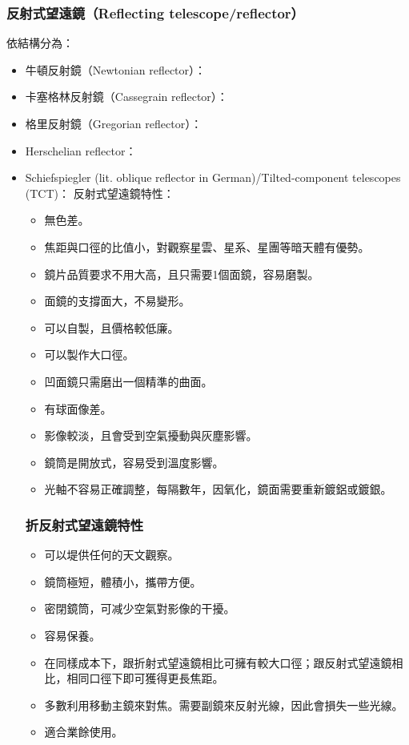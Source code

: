 \documentclass[a4paper,12pt]{report}
\begin{document}
\subsubsection{反射式望遠鏡（Reflecting telescope/reflector）}
依結構分為：
\begin{itemize}
\item 牛頓反射鏡（Newtonian reflector）：
\bctf{}\efct
\item 卡塞格林反射鏡（Cassegrain reflector）：
\bctf{}\efct
\item 格里反射鏡（Gregorian reflector）：
\bctf{}\efct
\item Herschelian reflector：
\bctf{}\efct
\item Schiefspiegler (lit. oblique reflector in German)/Tilted-component telescopes (TCT)：
\bctf{}\efct
\eit
反射式望遠鏡特性：
\begin{itemize}
\item 無色差。
\item 焦距與口徑的比值小，對觀察星雲、星系、星團等暗天體有優勢。
\item 鏡片品質要求不用大高，且只需要1個面鏡，容易磨製。
\item 面鏡的支撐面大，不易變形。
\item 可以自製，且價格較低廉。
\item 可以製作大口徑。
\item 凹面鏡只需磨出一個精準的曲面。
\item 有球面像差。
\item 影像較淡，且會受到空氣擾動與灰塵影響。
\item 鏡筒是開放式，容易受到溫度影響。
\item 光軸不容易正確調整，每隔數年，因氧化，鏡面需要重新鍍鋁或鍍銀。
\end{itemize}
\subsubsection{折反射式望遠鏡特性}
\begin{itemize}
\item 可以堤供任何的天文觀察。
\item 鏡筒極短，體積小，攜帶方便。
\item 密閉鏡筒，可减少空氣對影像的干擾。
\item 容易保養。
\item 在同樣成本下，跟折射式望遠鏡相比可擁有較大口徑；跟反射式望遠鏡相比，相同口徑下即可獲得更長焦距。
\item 多數利用移動主鏡來對焦。需要副鏡來反射光線，因此會損失一些光線。
\item 適合業餘使用。
\end{itemize}

\end{itemize}
\end{document}
